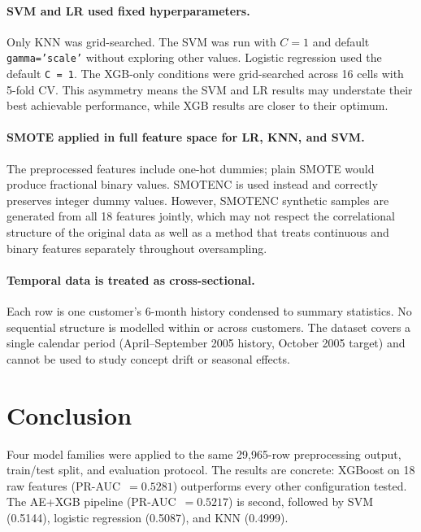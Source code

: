 \documentclass[12pt,a4paper]{article}
\begin{document}
\paragraph{SVM and LR used fixed hyperparameters.}
Only KNN was grid-searched. The SVM was run with $C = 1$ and default
\texttt{gamma='scale'} without exploring other values. Logistic regression
used the default \texttt{C = 1}. The XGB-only conditions were grid-searched
across 16 cells with 5-fold CV. This asymmetry means the SVM and LR results
may understate their best achievable performance, while XGB results are
closer to their optimum.

\paragraph{SMOTE applied in full feature space for LR, KNN, and SVM.}
The preprocessed features include one-hot dummies; plain SMOTE would produce
fractional binary values. SMOTENC is used instead and correctly preserves
integer dummy values. However, SMOTENC synthetic samples are generated from
all 18 features jointly, which may not respect the correlational structure
of the original data as well as a method that treats continuous and binary
features separately throughout oversampling.

\paragraph{Temporal data is treated as cross-sectional.}
Each row is one customer's 6-month history condensed to summary statistics.
No sequential structure is modelled within or across customers. The dataset
covers a single calendar period (April--September 2005 history, October 2005
target) and cannot be used to study concept drift or seasonal effects.

\section{Conclusion}

Four model families were applied to the same 29,965-row preprocessing
output, train/test split, and evaluation protocol. The results are concrete:
XGBoost on 18 raw features (PR-AUC~$= 0.5281$) outperforms every other
configuration tested. The AE+XGB pipeline (PR-AUC~$= 0.5217$) is second,
followed by SVM (0.5144), logistic regression (0.5087), and KNN (0.4999).
\end{document}
